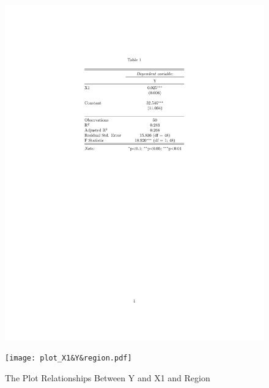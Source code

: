 \documentclass[12pt,letterpaper]{article}
\begin{document}
\begin{itemize}
\begin{figure}[h!]\centering
	\includegraphics[width=.85\textwidth]{regression_output1}
\end{figure}

\begin{figure}[h!]\centering
	\caption{\footnotesize The Plot Relationships Between Y and X1 and Region}
	\label{fig:plot_4}
	\texttt{[image: plot\_X1\&Y\&region.pdf]}
\end{figure}

\end{itemize}
\end{document}
